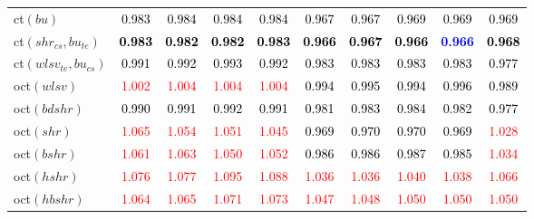 \begin{tabular}[t]{l|ccccccccc}
ct$(bu)$ & \textcolor{black}{0.983} & \textcolor{black}{0.984} & \textcolor{black}{0.984} & \textcolor{black}{0.984} & \textcolor{black}{0.967} & \textcolor{black}{0.967} & \textcolor{black}{0.969} & \textcolor{black}{0.969} & \textcolor{black}{0.969}\\
ct$(shr_{cs}, bu_{te})$ & \textcolor{black}{\textbf{0.983}} & \textcolor{black}{\textbf{0.982}} & \textcolor{black}{\textbf{0.982}} & \textcolor{black}{\textbf{0.983}} & \textcolor{black}{\textbf{0.966}} & \textcolor{black}{\textbf{0.967}} & \textcolor{black}{\textbf{0.966}} & \textcolor{blue}{\textbf{0.966}} & \textcolor{black}{\textbf{0.968}}\\
ct$(wlsv_{te}, bu_{cs})$ & \textcolor{black}{0.991} & \textcolor{black}{0.992} & \textcolor{black}{0.993} & \textcolor{black}{0.992} & \textcolor{black}{0.983} & \textcolor{black}{0.983} & \textcolor{black}{0.983} & \textcolor{black}{0.983} & \textcolor{black}{0.977}\\
oct$(wlsv)$ & \textcolor{red}{1.002} & \textcolor{red}{1.004} & \textcolor{red}{1.004} & \textcolor{red}{1.004} & \textcolor{black}{0.994} & \textcolor{black}{0.995} & \textcolor{black}{0.994} & \textcolor{black}{0.996} & \textcolor{black}{0.989}\\
oct$(bdshr)$ & \textcolor{black}{0.990} & \textcolor{black}{0.991} & \textcolor{black}{0.992} & \textcolor{black}{0.991} & \textcolor{black}{0.981} & \textcolor{black}{0.983} & \textcolor{black}{0.984} & \textcolor{black}{0.982} & \textcolor{black}{0.977}\\
oct$(shr)$ & \textcolor{red}{1.065} & \textcolor{red}{1.054} & \textcolor{red}{1.051} & \textcolor{red}{1.045} & \textcolor{black}{0.969} & \textcolor{black}{0.970} & \textcolor{black}{0.970} & \textcolor{black}{0.969} & \textcolor{red}{1.028}\\
oct$(bshr)$ & \textcolor{red}{1.061} & \textcolor{red}{1.063} & \textcolor{red}{1.050} & \textcolor{red}{1.052} & \textcolor{black}{0.986} & \textcolor{black}{0.986} & \textcolor{black}{0.987} & \textcolor{black}{0.985} & \textcolor{red}{1.034}\\
oct$(hshr)$ & \textcolor{red}{1.076} & \textcolor{red}{1.077} & \textcolor{red}{1.095} & \textcolor{red}{1.088} & \textcolor{red}{1.036} & \textcolor{red}{1.036} & \textcolor{red}{1.040} & \textcolor{red}{1.038} & \textcolor{red}{1.066}\\
oct$(hbshr)$ & \textcolor{red}{1.064} & \textcolor{red}{1.065} & \textcolor{red}{1.071} & \textcolor{red}{1.073} & \textcolor{red}{1.047} & \textcolor{red}{1.048} & \textcolor{red}{1.050} & \textcolor{red}{1.050} & \textcolor{red}{1.050}\\

\end{tabular}
